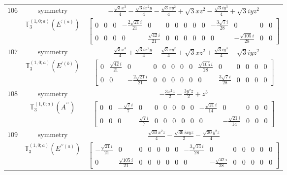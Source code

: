 \documentclass[fleqn,8pt,landscape]{jsarticle}
\begin{document}
\begin{longtable}{ccc}
$ 106 $ & $ \text{symmetry} $ & $ - \frac{\sqrt{3} x^{3}}{4} - \frac{\sqrt{3} i x^{2} y}{4} - \frac{\sqrt{3} x y^{2}}{4} + \sqrt{3} x z^{2} - \frac{\sqrt{3} i y^{3}}{4} + \sqrt{3} i y z^{2} $ \\
$  $ & $ \mathbb{T}_{3}^{(1,0;a)}(E^{\prime(a)}) $ & $ \begin{bmatrix} 0 & 0 & 0 & - \frac{2 \sqrt{21} i}{21} & 0 & 0 & 0 & 0 & 0 & 0 & - \frac{3 \sqrt{7} i}{28} & 0 & 0 & 0 \\ 0 & 0 & 0 & 0 & \frac{\sqrt{42} i}{21} & 0 & 0 & 0 & 0 & 0 & 0 & - \frac{\sqrt{105} i}{28} & 0 & 0 \end{bmatrix} $ \\ \hline
$ 107 $ & $ \text{symmetry} $ & $ - \frac{\sqrt{3} x^{3}}{4} + \frac{\sqrt{3} i x^{2} y}{4} - \frac{\sqrt{3} x y^{2}}{4} + \sqrt{3} x z^{2} + \frac{\sqrt{3} i y^{3}}{4} - \sqrt{3} i y z^{2} $ \\
$  $ & $ \mathbb{T}_{3}^{(1,0;a)}(E^{\prime(b)}) $ & $ \begin{bmatrix} 0 & \frac{\sqrt{42} i}{21} & 0 & 0 & 0 & 0 & 0 & 0 & \frac{\sqrt{105} i}{28} & 0 & 0 & 0 & 0 & 0 \\ 0 & 0 & - \frac{2 \sqrt{21} i}{21} & 0 & 0 & 0 & 0 & 0 & 0 & \frac{3 \sqrt{7} i}{28} & 0 & 0 & 0 & 0 \end{bmatrix} $ \\ \hline
$ 108 $ & $ \text{symmetry} $ & $ - \frac{3 x^{2} z}{2} - \frac{3 y^{2} z}{2} + z^{3} $ \\
$  $ & $ \mathbb{T}_{3}^{(1,0;a)}(A^{\prime\prime}) $ & $ \begin{bmatrix} 0 & 0 & - \frac{\sqrt{7} i}{7} & 0 & 0 & 0 & 0 & 0 & 0 & - \frac{\sqrt{21} i}{14} & 0 & 0 & 0 & 0 \\ 0 & 0 & 0 & \frac{\sqrt{7} i}{7} & 0 & 0 & 0 & 0 & 0 & 0 & - \frac{\sqrt{21} i}{14} & 0 & 0 & 0 \end{bmatrix} $ \\ \hline
$ 109 $ & $ \text{symmetry} $ & $ \frac{\sqrt{30} x^{2} z}{4} - \frac{\sqrt{30} i x y z}{2} - \frac{\sqrt{30} y^{2} z}{4} $ \\
$  $ & $ \mathbb{T}_{3}^{(1,0;a)}(E^{\prime\prime(a)}) $ & $ \begin{bmatrix} - \frac{\sqrt{21} i}{21} & 0 & 0 & 0 & 0 & 0 & 0 & - \frac{3 \sqrt{14} i}{28} & 0 & 0 & 0 & 0 & 0 & 0 \\ 0 & \frac{\sqrt{105} i}{21} & 0 & 0 & 0 & 0 & 0 & 0 & - \frac{\sqrt{42} i}{28} & 0 & 0 & 0 & 0 & 0 \end{bmatrix} $ \\ \hline

\end{longtable}
\end{document}
